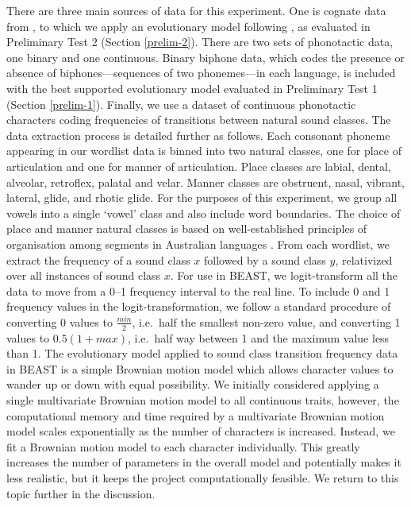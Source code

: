 \documentclass[]{article}
\begin{document}
There are three main sources of data for this experiment. One is cognate data from \textcite{bouckaert_origin_2018}, to which we apply an evolutionary model following \textcite{bouckaert_origin_2018}, as evaluated in Preliminary Test 2 (Section \ref{prelim-2}). There are two sets of phonotactic data, one binary and one continuous. Binary biphone data, which codes the presence or absence of biphones---sequences of two phonemes---in each language, is included with the best supported evolutionary model evaluated in Preliminary Test 1 (Section \ref{prelim-1}). Finally, we use a dataset of continuous phonotactic characters coding frequencies of transitions between natural sound classes. The data extraction process is detailed further as follows. Each consonant phoneme appearing in our wordlist data is binned into two natural classes, one for place of articulation and one for manner of articulation. Place classes are labial, dental, alveolar, retroflex, palatal and velar. Manner classes are obstruent, nasal, vibrant, lateral, glide, and rhotic glide. For the purposes of this experiment, we group all vowels into a single `vowel' class and also include word boundaries. The choice of place and manner natural classes is based on well-established principles of organisation among segments in Australian languages \autocites{dixon_languages_1980}{hamilton_phonetic_1996}{baker_word_2014}{round_segment_2021}{round_phonotactics_2021}. From each wordlist, we extract the frequency of a sound class \(x\) followed by a sound class \(y\), relativized over all instances of sound class \(x\). For use in BEAST, we logit-transform all the data to move from a 0--1 frequency interval to the real line. To include 0 and 1 frequency values in the logit-transformation, we follow a standard procedure of converting 0 values to \(\frac{min}{2}\), i.e.~half the smallest non-zero value, and converting 1 values to \(0.5 (1 + max)\), i.e.~half way between 1 and the maximum value less than 1. The evolutionary model applied to sound class transition frequency data in BEAST is a simple Brownian motion model which allows character values to wander up or down with equal possibility. We initially considered applying a single multivariate Brownian motion model to all continuous traits, however, the computational memory and time required by a multivariate Brownian motion model scales exponentially as the number of characters is increased. Instead, we fit a Brownian motion model to each character individually. This greatly increases the number of parameters in the overall model and potentially makes it less realistic, but it keeps the project computationally feasible. We return to this topic further in the discussion.
\end{document}
